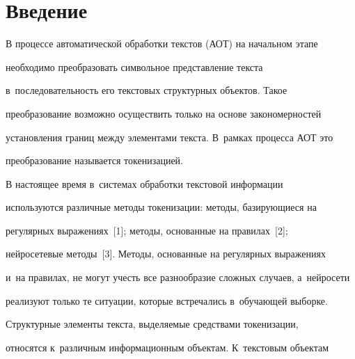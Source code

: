 




 \thispagestyle{headings}


 


 \vspace*{-18pt}


  


\section{Введение}





\vspace*{-2pt}


  


  В процессе автоматической обработки текстов (АОТ) на начальном этапе 


необходимо преобразовать символьное представление текста 


в~последовательность его текстовых структурных объектов. Такое 


преобразование возможно осуществить только на основе закономерностей 


установления границ между элементами текста. В~рамках процесса АОТ это 


преобразование называется токенизацией. 


  


  В настоящее время в~системах обработки текстовой информации 


используются различные методы токенизации: методы, базирующиеся на 


регулярных выражениях~[1]; методы, основанные на правилах~[2]; 


нейросетевые методы~[3]. Методы, основанные на регулярных выражениях 


и~на правилах, не могут учесть все разнообразие сложных случаев, а~нейросети 


реализуют только те ситуации, которые встречались в~обучающей выборке.


  


  Структурные элементы текста, выделяемые средствами токенизации, 


относятся к~различным информационным объектам. К~текстовым объектам 


